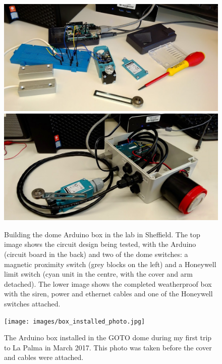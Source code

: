 \begin{colsection}
\begin{figure}[p]
    \begin{center}
        \includegraphics[width=\linewidth]{images/arduino_photo.jpg}
        \includegraphics[width=\linewidth]{images/box_photo.jpg}
    \end{center}
    \caption[Building the dome Arduino box]{
        Building the dome Arduino box in the lab in Sheffield. The top image shows the circuit design being tested, with the Arduino (circuit board in the back) and two of the dome switches: a magnetic proximity switch (grey blocks on the left) and a Honeywell limit switch (cyan unit in the centre, with the cover and arm detached). The lower image shows the completed weatherproof box with the siren, power and ethernet cables and one of the Honeywell switches attached.
    }\label{fig:arduino_wip}
\end{figure}

\newpage

\begin{figure}[p]
    \begin{center}
        \texttt{[image: images/box\_installed\_photo.jpg]}
    \end{center}
    \caption[The Arduino box installed in the GOTO dome]{
        The Arduino box installed in the GOTO dome during my first trip to La Palma in March 2017. This photo was taken before the cover and cables were attached.
    }\label{fig:arduino_installed}
\end{figure}


\end{colsection}
